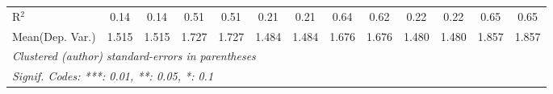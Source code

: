 \begin{tabular}{lcccccccccccc}
   R$^2$                                    & 0.14          & 0.14          & 0.51          & 0.51           & 0.21          & 0.21           & 0.64    & 0.62    & 0.22          & 0.22          & 0.65    & 0.65\\  
Mean(Dep. Var.) & 1.515 & 1.515 & 1.727 & 1.727 & 1.484 & 1.484 & 1.676 & 1.676 & 1.480 & 1.480 & 1.857 & 1.857 \\
   \midrule \midrule
   \multicolumn{13}{l}{\emph{Clustered (author) standard-errors in parentheses}}\\
   \multicolumn{13}{l}{\emph{Signif. Codes: ***: 0.01, **: 0.05, *: 0.1}}\\
\end{tabular}
\par\endgroup

